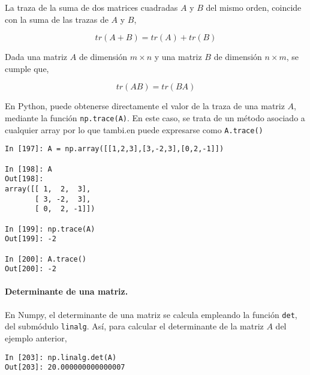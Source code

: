\begin{paracol}{2}
La traza de la suma de dos matrices cuadradas $A$ y $B$ del mismo orden, coincide con la suma de las trazas de $A$ y $B$,    
\end{paracol}

\begin{equation*}
tr(A+B)=tr(A)+tr(B)
\end{equation*}

\begin{paracol}{2}
Dada una  matriz $A$ de dimensión $m\times n$  y una matriz $B$ de dimensión $n \times m$, se  cumple que,    
\end{paracol}

\begin{equation*}
tr(AB)=tr(BA)
\end{equation*}
\begin{paracol}{2}
En Python, puede obtenerse directamente el valor de la traza de una matriz $A$, mediante la función \texttt{np.trace(A)}. En este caso, se trata de un método asociado a cualquier array por lo que tambi.en puede expresarse como \texttt{A.trace()}  
\end{paracol}

\begin{center}
\begin{minipage}{0.5\textwidth}
\begin{verbatim}
In [197]: A = np.array([[1,2,3],[3,-2,3],[0,2,-1]])

In [198]: A
Out[198]: 
array([[ 1,  2,  3],
       [ 3, -2,  3],
       [ 0,  2, -1]])

In [199]: np.trace(A)
Out[199]: -2

In [200]: A.trace()
Out[200]: -2
\end{verbatim}
\end{minipage}
\end{center}


\begin{paracol}{2}
\paragraph{Determinante de una matriz.} 
En Numpy, el determinante de una matriz se calcula  empleando la función \texttt{det}, del submódulo \texttt{linalg}. Así, para calcular el determinante de la matriz $A$ del ejemplo anterior,
\end{paracol}
\begin{center}
\begin{minipage}{0.5\textwidth}
\begin{verbatim}
In [203]: np.linalg.det(A)
Out[203]: 20.000000000000007
\end{verbatim}
\end{minipage}
\end{center}

